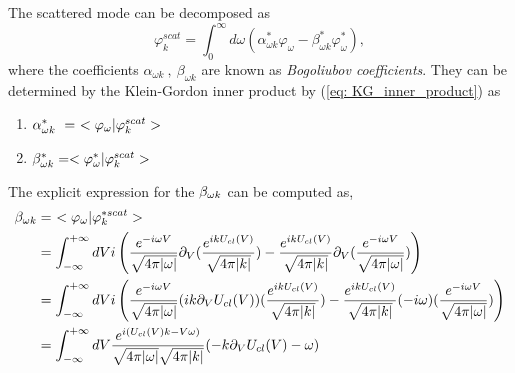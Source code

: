  The scattered mode can be decomposed as 
 \begin{equation*}
     \varphi_k^{scat} = \int_0^\infty d\omega(\alpha^*_{\omega k}\varphi_\omega-\beta^*_{\omega k}\varphi_\omega^*),
 \end{equation*}
where the coefficients $\alpha_{\omega k}~,~\beta_{\omega k}$ are known as \emph{Bogoliubov coefficients}. They can be determined by the Klein-Gordon inner product by (\ref{eq: KG_inner_product}) as  
\begin{enumerate}
    \item $\alpha_{\omega k}^*~=~<\varphi_{\omega}|\varphi^{scat}_k>$
    \item $\beta_{\omega k}^*=<\varphi^*_{\omega}|\varphi^{scat}_k>$
\end{enumerate}
The explicit expression for the $\beta_{\omega k}$ can be computed as,
\begin{eqnarray}\label{eq:beta}
\begin{aligned}
    \beta_{\omega k} &=~ <\varphi_{\omega}|\varphi^{*scat}_k> \\
    &=\int_{-\infty}^{+\infty} dV i\left(\frac{e^{-i \omega V}}{\sqrt{4\pi|\omega|}}\partial_V(\frac{e^{i k U_{cl}(V)}}{\sqrt{4\pi|k|}})-\frac{e^{i k U_{cl}(V)}}{\sqrt{4\pi|k|}}\partial_V(\frac{e^{-i \omega V}}{\sqrt{4\pi|\omega|}})\right)\\
    &=\int_{-\infty}^{+\infty} dV i\left(\frac{e^{-i \omega V}}{\sqrt{4\pi|\omega|}}(ik\partial_VU_{cl}(V))(\frac{e^{i k U_{cl}(V)}}{\sqrt{4\pi|k|}})-\frac{e^{i k U_{cl}(V)}}{\sqrt{4\pi|k|}}(-i\omega)(\frac{e^{-i \omega V}}{\sqrt{4\pi|\omega|}})\right)\\
    &=\int_{-\infty}^{+\infty} dV \frac{e^{i(U_{cl}(V)k-V\omega)}}{\sqrt{4\pi|\omega|}\sqrt{4\pi |k|}}(-k\partial_V U_{cl}(V)-\omega)\\
    \end{aligned}
\end{eqnarray}


